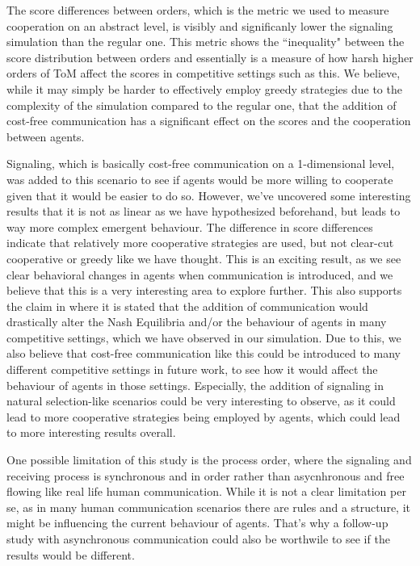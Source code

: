 The score differences between orders, which is the metric we used to measure cooperation on an abstract level, is visibly and significanly lower the signaling simulation than the regular one. This metric shows the ``inequality" between the score distribution between orders and essentially is a measure of how harsh higher orders of ToM affect the scores in competitive settings such as this. We believe, while it may simply be harder to effectively employ greedy strategies due to the complexity of the simulation compared to the regular one, that the addition of cost-free communication has a significant effect on the scores and the cooperation between agents.

Signaling, which is basically cost-free communication on a 1-dimensional level, was added to this scenario to see if agents would be more willing to cooperate given that it would be easier to do so. However, we've uncovered some interesting results that it is not as linear as we have hypothesized beforehand, but leads to way more complex emergent behaviour. The difference in score differences indicate that relatively more cooperative strategies are used, but not clear-cut cooperative or greedy like we have thought. This is an exciting result, as we see clear behavioral changes in agents when communication is introduced, and we believe that this is a very interesting area to explore further. This also supports the claim in \cite{farrell1996cheap} where it is stated that the addition of communication would drastically alter the Nash Equilibria and/or the behaviour of agents in many competitive settings, which we have observed in our simulation. Due to this, we also believe that cost-free communication like this could be introduced to many different competitive settings in future work, to see how it would affect the behaviour of agents in those settings. Especially, the addition of signaling in natural selection-like scenarios could be very interesting to observe, as it could lead to more cooperative strategies being employed by agents, which could lead to more interesting results overall.

One possible limitation of this study is the process order, where the signaling and receiving process is synchronous and in order rather than asycnhronous and free flowing like real life human communication. While it is not a clear limitation per se, as in many human communication scenarios there are rules and a structure, it might be influencing the current behaviour of agents. That's why a follow-up study with asynchronous communication could also be worthwile to see if the results would be different. 

